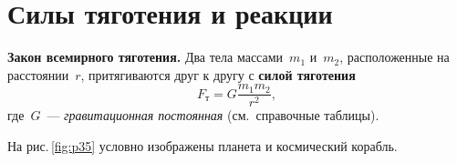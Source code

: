 \documentclass[main.tex]{subfiles}
\begin{document}



\pagestyle{empty}

 

\setcounter{section}{18
}
\addtocounter{section}{-1} 

\section{Силы тяготения и реакции}


\begin{law}
\textbf{Закон всемирного тяготения.} Два тела массами~$m_1$ и~$m_2$, расположенные на расстоянии~$r$, притягиваются
друг к другу с \textbf{силой тяготения}
\begin{equation}
    \label{e8}
    F_\text{т}=G\dfrac{m_1m_2}{r^2},
\end{equation}
где~$G$~--- \emph{гравитационная постоянная} (см.~справочные таблицы). 
\end{law}

На рис.\,\ref{fig:p35} условно изображены планета и космический корабль.
\end{document}
